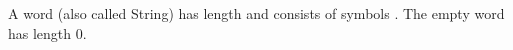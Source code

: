 A word \word (also called String) has length \length and consists of symbols \symbol \elem \sigmaS. \newline
The empty word \emptyword has length 0. \newline
{}